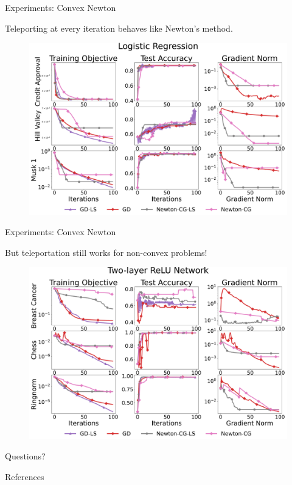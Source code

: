 \documentclass[usenames,dvipsnames,mathserif,notheorems]{beamer}
\newcommand{\bad}[1]{\textcolor{bad}{#1}}
\newcommand{\good}[1]{\textcolor{good}{#1}}
\begin{document}
\begin{frame}{Experiments: Convex Newton}

    Teleporting at every iteration behaves like \bad{Newton's method}.

    \pause

    \begin{figure}
        \centering
        \includegraphics[width=1.0\textwidth]{assets/newton_comparison_logreg.pdf}
    \end{figure}

\end{frame}

\begin{frame}{Experiments: Convex Newton}

    But teleportation still works for \good{non-convex problems}!

    \pause

    \begin{figure}
        \centering
        \includegraphics[width=1.0\textwidth]{assets/newton_comparison_network.pdf}
    \end{figure}

\end{frame}

\begin{frame}{}
    \begin{center}
        \huge Questions?
    \end{center}
\end{frame}

\begin{frame}[allowframebreaks]{References}
    \printbibliography[]
\end{frame}
\end{document}

